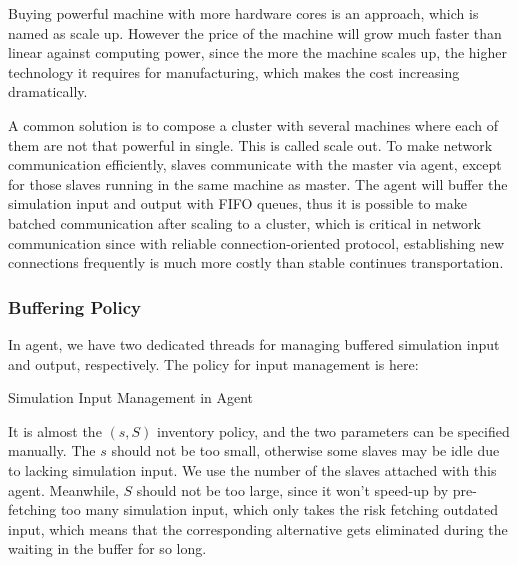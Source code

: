 Buying powerful machine with more hardware cores is an approach, which is named as scale up. However the price of the machine will grow much faster than linear against computing power, since the more the machine scales up, the higher technology it requires for manufacturing, which makes the cost increasing dramatically.

A common solution is to compose a cluster with several machines where each of them are not that powerful in single. This is called scale out. To make network communication efficiently, slaves communicate with the master via agent, except for those slaves running in the same machine as master. The agent will buffer the simulation input and output with FIFO queues, thus it is possible to make batched communication after scaling to a cluster, which is critical in network communication since with reliable connection-oriented protocol, establishing new connections frequently is much more costly than stable continues transportation.

\subsubsection{Buffering Policy}

In agent, we have two dedicated threads for managing buffered simulation input and output, respectively. The policy for input management is here:

\begin{algorithm}
\begin{algorithmic}[1]
    \EndFor
  \Else
  \EndIf
\EndWhile
\end{algorithmic}
\caption{Simulation Input Management in Agent}
\label{input_buf_alg}
\end{algorithm}

It is almost the $(s, S)$ inventory policy, and the two parameters can be specified manually. The $s$ should not be too small, otherwise some slaves may be idle due to lacking simulation input. We use the number of the slaves attached with this agent. Meanwhile, $S$ should not be too large, since it won't speed-up by pre-fetching too many simulation input, which only takes the risk fetching outdated input, which means that the corresponding alternative gets eliminated during the waiting in the buffer for so long.

